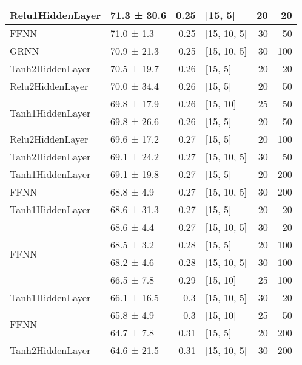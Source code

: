 \begin{table*}[h]
\begin{tabular}{llrlrr}
 \hline
Relu1HiddenLayer         & 71.3 ± 30.6 &  0.25 & [15, 5]        &         20 &       20 \\
 \hline
FFNN         & 71.0 ± 1.3  &  0.25 & [15, 10, 5]    &         30 &       50 \\
 \hline
GRNN         & 70.9 ± 21.3 &  0.25 & [15, 10, 5]    &         30 &      100 \\
 \hline
Tanh2HiddenLayer         & 70.5 ± 19.7 &  0.26 & [15, 5]        &         20 &       20 \\
 \hline
Relu2HiddenLayer         & 70.0 ± 34.4 &  0.26 & [15, 5]        &         20 &       50 \\
 \hline
\multirow{2}{*}{Tanh1HiddenLayer}         & 69.8 ± 17.9 &  0.26 & [15, 10]       &         25 &       50 \\
         & 69.8 ± 26.6 &  0.26 & [15, 5]        &         20 &       50 \\
 \hline
Relu2HiddenLayer         & 69.6 ± 17.2 &  0.27 & [15, 5]        &         20 &      100 \\
 \hline
Tanh2HiddenLayer         & 69.1 ± 24.2 &  0.27 & [15, 10, 5]    &         30 &       50 \\
 \hline
Tanh1HiddenLayer         & 69.1 ± 19.8 &  0.27 & [15, 5]        &         20 &      200 \\
 \hline
FFNN         & 68.8 ± 4.9  &  0.27 & [15, 10, 5]    &         30 &      200 \\
 \hline
Tanh1HiddenLayer         & 68.6 ± 31.3 &  0.27 & [15, 5]        &         20 &       20 \\
 \hline
\multirow{4}{*}{FFNN}         & 68.6 ± 4.4  &  0.27 & [15, 10, 5]    &         30 &       20 \\
         & 68.5 ± 3.2  &  0.28 & [15, 5]        &         20 &      100 \\
         & 68.2 ± 4.6  &  0.28 & [15, 10, 5]    &         30 &      100 \\
         & 66.5 ± 7.8  &  0.29 & [15, 10]       &         25 &      100 \\
 \hline
Tanh1HiddenLayer         & 66.1 ± 16.5 &  0.3  & [15, 10, 5]    &         30 &       20 \\
 \hline
\multirow{2}{*}{FFNN}         & 65.8 ± 4.9  &  0.3  & [15, 10]       &         25 &       50 \\
         & 64.7 ± 7.8  &  0.31 & [15, 5]        &         20 &      200 \\
 \hline
Tanh2HiddenLayer         & 64.6 ± 21.5 &  0.31 & [15, 10, 5]    &         30 &      200 \\

\end{tabular}
\end{table*}

